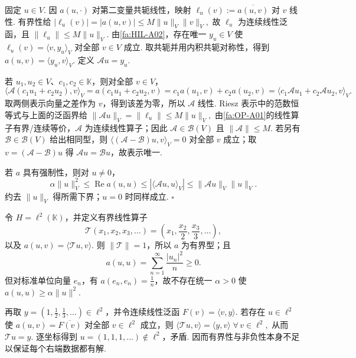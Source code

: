 \begin{FAProof}
固定 \(\displaystyle u\in V\). 因 \(\displaystyle a(u,\cdot)\) 对第二变量共轭线性，映射 \(\displaystyle \ell_u(v) := \overline{a(u,v)}\)
对 \(\displaystyle v\) 线性. 有界性给 \(\displaystyle |\ell_u(v)| = |a(u,v)| \leqslant M\|u\|_V\|v\|_V,\)
故 \(\displaystyle\ell_u\) 为连续线性泛函，且 \(\displaystyle\|\ell_u\|\leqslant M\|u\|_V\). 由\autoref{fa:HIL-A02}，存在唯一 \(\displaystyle y_u\in V\) 使 \(\displaystyle\ell_u(v)=\langle v,y_u\rangle_V\) 对全部 \(\displaystyle v\in V\) 成立. 取共轭并用内积共轭对称性，得到 \(\displaystyle a(u,v) = \langle y_u,v\rangle_V.\)
定义 \(\displaystyle\mathcal Au=y_u\).

若 \(\displaystyle u_1,u_2\in V\)、\(\displaystyle c_1,c_2\in\mathbb K\)，则对全部 \(\displaystyle v\in V\)，
\[
\langle\mathcal A(c_1u_1+c_2u_2),v\rangle_V=a(c_1u_1+c_2u_2,v)=c_1a(u_1,v)+c_2a(u_2,v)=\langle c_1\mathcal Au_1+c_2\mathcal Au_2,v\rangle_V.
\]
取两侧表示向量之差作为 \(\displaystyle v\)，得到该差为零，所以 \(\displaystyle\mathcal A\) 线性. Riesz 表示中的范数恒等式与上面的泛函界给 \(\displaystyle \|\mathcal Au\|_V = \|\ell_u\| \leqslant M\|u\|_V,\)
由\autoref{fa:OP-A01}的线性算子有界/连续等价，\(\displaystyle\mathcal A\) 为连续线性算子；因此 \(\displaystyle\mathcal A\in\mathcal B(V)\) 且 \(\displaystyle\|\mathcal A\|\leqslant M\). 若另有 \(\displaystyle\mathcal B\in\mathcal B(V)\) 给出相同型，则 \(\displaystyle\langle(\mathcal A-\mathcal B)u,v\rangle_V=0\) 对全部 \(\displaystyle v\) 成立；取 \(\displaystyle v=(\mathcal A-\mathcal B)u\) 得 \(\displaystyle\mathcal Au=\mathcal Bu\)，故表示唯一.

若 \(\displaystyle a\) 具有强制性，则对 \(\displaystyle u\neq0\)，
\[
\alpha\|u\|_V^2
\leqslant
\operatorname{Re}a(u,u)
\leqslant
|\langle\mathcal Au,u\rangle_V|
\leqslant
\|\mathcal Au\|_V\|u\|_V.
\]
约去 \(\displaystyle\|u\|_V\) 得所需下界；\(\displaystyle u=0\) 时同样成立.
\hfill\(\square\)
\end{FAProof}

\begin{FACounterexample}[删除强制性后存在性可以失败]\label{ii15:noncoercive-lm-failure}
令 \(\displaystyle H=\ell^2(\mathbb K)\)，并定义有界线性算子
\[
\mathcal T(x_1,x_2,x_3,\dots)
=
\left(x_1,\frac{x_2}{2},\frac{x_3}{3},\dots\right),
\]
以及 \(\displaystyle a(u,v)=\langle\mathcal Tu,v\rangle\). 则 \(\displaystyle\|\mathcal T\|=1\)，所以 \(\displaystyle a\) 为有界型；且
\[
a(u,u)
=
\sum_{n=1}^{\infty}\frac{|u_n|^2}{n}
\geqslant0.
\]
但对标准单位向量 \(\displaystyle e_n\)，有 \(\displaystyle a(e_n,e_n)=\frac{1}{n}\)，故不存在统一 \(\displaystyle\alpha>0\) 使 \(\displaystyle a(u,u)\geqslant\alpha\|u\|^2\).

再取 \(\displaystyle y=(1,\frac{1}{2},\frac{1}{3},\dots)\in\ell^2\)，并令连续线性泛函 \(\displaystyle F(v)=\langle v,y\rangle\). 若存在 \(\displaystyle u\in\ell^2\) 使 \(\displaystyle a(u,v)=\overline{F(v)}\) 对全部 \(\displaystyle v\in\ell^2\) 成立，则 \(\displaystyle \langle\mathcal Tu,v\rangle = \langle y,v\rangle \; \forall\,v\in\ell^2,\)
从而 \(\displaystyle\mathcal Tu=y\). 逐坐标得到 \(\displaystyle u=(1,1,1,\dots)\notin\ell^2\)，矛盾. 因而有界性与非负性本身不足以保证每个右端数据都有解.
\end{FACounterexample}

